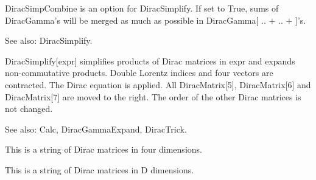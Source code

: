 DiracSimpCombine is an option for DiracSimplify. If set to True, sums of DiracGamma's will be merged as much as possible in DiracGamma[
  .. \(+\) .. \(+\) ]'s.

See also: DiracSimplify.



DiracSimplify[expr] simplifies products of Dirac matrices in expr and expands non-commutative products. Double Lorentz indices and four
  vectors are contracted. The Dirac equation is applied. All DiracMatrix[5], DiracMatrix[6] and DiracMatrix[7] are moved to the right.
  The order of the other Dirac matrices is not changed.



See also:  Calc, DiracGammaExpand, DiracTrick.


This is a string of Dirac matrices in four dimensions. 




\dispSFoutmath{
-2\multsp {{\gamma }^{\nu }}
}

This is a string of Dirac matrices in D dimensions. 




